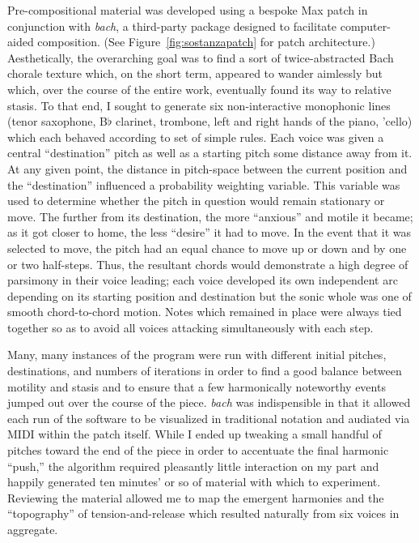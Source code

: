     Pre-compositional material was developed using a bespoke Max\autocite{MAX} patch in conjunction with \textit{bach}, a third-party package designed to facilitate computer-aided composition.\autocite{Agostini_Ghisi} (See Figure~\ref{fig:sostanzapatch} for patch architecture.) Aesthetically, the overarching goal was to find a sort of twice-abstracted Bach chorale texture which, on the short term, appeared to wander aimlessly but which, over the course of the entire work, eventually found its way to relative stasis. To that end, I sought to generate six non-interactive monophonic lines (tenor saxophone, B$\flat$ clarinet, trombone, left and right hands of the piano, 'cello) which each behaved according to set of simple rules. Each voice was given a central ``destination'' pitch as well as a starting pitch some distance away from it. At any given point, the distance in pitch-space between the current position and the ``destination'' influenced a probability weighting variable. This variable was used to determine whether the pitch in question would remain stationary or move. The further from its destination, the more ``anxious'' and motile it became; as it got closer to home, the less ``desire'' it had to move. In the event that it was selected to move, the pitch had an equal chance to move up or down and by one or two half-steps. Thus, the resultant chords would demonstrate a high degree of parsimony in their voice leading; each voice developed its own independent arc depending on its starting position and destination but the sonic whole was one of smooth chord-to-chord motion. Notes which remained in place were always tied together so as to avoid all voices attacking simultaneously with each step.

    Many, many instances of the program were run with different initial pitches, destinations, and numbers of iterations in order to find a good balance between motility and stasis and to ensure that a few harmonically noteworthy events jumped out over the course of the piece. \textit{bach} was indispensible in that it allowed each run of the software to be visualized in traditional notation and audiated via MIDI within the patch itself. While I ended up tweaking a small handful of pitches toward the end of the piece in order to accentuate the final harmonic ``push,'' the algorithm required pleasantly little interaction on my part and happily generated ten minutes' or so of material with which to experiment. Reviewing the material allowed me to map the emergent harmonies and the ``topography'' of tension-and-release which resulted naturally from six voices in aggregate. 

